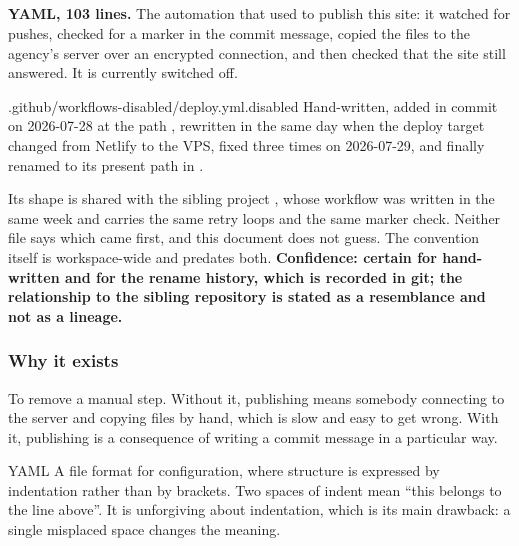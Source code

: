\subsection{}

\textbf{YAML, 103 lines.} The automation that used to publish this site: it
watched for pushes, checked for a marker in the commit message, copied the files
to the agency's server over an encrypted connection, and then checked that the
site still answered. It is currently switched off.

\begin{provenance}{.github/workflows-disabled/deploy.yml.disabled}
Hand-written, added in commit  on 2026-07-28 at the path
, rewritten in  the same day when
the deploy target changed from Netlify to the VPS, fixed three times on 2026-07-29,
and finally renamed to its present path in .

Its shape is shared with the sibling project , whose
workflow was written in the same week and carries the same retry loops and the
same \code{[deploy]} marker check. Neither file says which came first, and this
document does not guess. The \code{[deploy]} convention itself is
workspace-wide and predates both. \textbf{Confidence: certain for hand-written and
for the rename history, which is recorded in git; the relationship to the sibling
repository is stated as a resemblance and not as a lineage.}
\end{provenance}

\subsubsection*{Why it exists}

To remove a manual step. Without it, publishing means somebody connecting to the
server and copying files by hand, which is slow and easy to get wrong. With it,
publishing is a consequence of writing a commit message in a particular way.

\begin{jargon}{YAML}
A file format for configuration, where structure is expressed by indentation
rather than by brackets. Two spaces of indent mean ``this belongs to the line
above''. It is unforgiving about indentation, which is its main drawback: a single
misplaced space changes the meaning.
\end{jargon}

